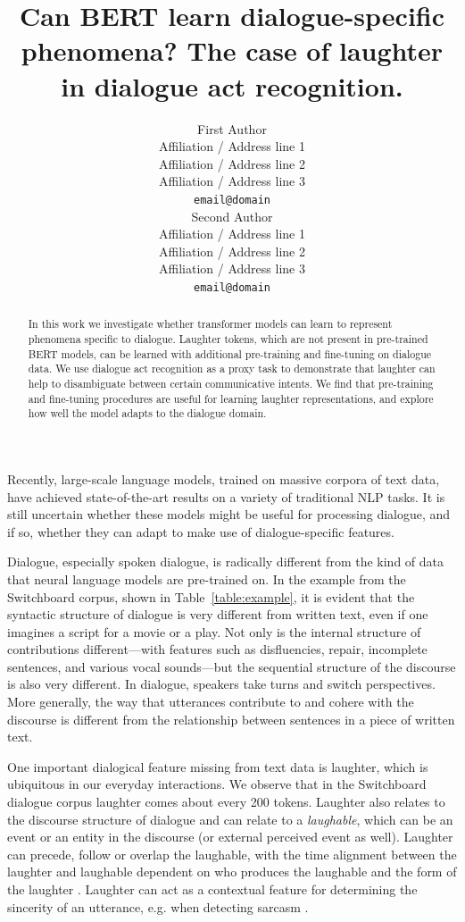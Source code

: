 \documentclass[11pt,a4paper]{article}
\title{Can BERT learn dialogue-specific phenomena? The case of laughter in dialogue act recognition. }
\author{First Author \\
  Affiliation / Address line 1 \\
  Affiliation / Address line 2 \\
  Affiliation / Address line 3 \\
  \texttt{email@domain} \\\And
  Second Author \\
  Affiliation / Address line 1 \\
  Affiliation / Address line 2 \\
  Affiliation / Address line 3 \\
  \texttt{email@domain} \\}
\date{}
\begin{document}
\maketitle
\begin{abstract}
   In this work we investigate whether transformer models can learn to represent phenomena specific to dialogue.
   Laughter tokens, which are not present in pre-trained BERT models, can be learned with additional pre-training and fine-tuning on dialogue data. 
   We use dialogue act recognition as a proxy task to demonstrate that laughter can help to disambiguate between certain communicative intents.
   We find that pre-training and fine-tuning procedures are useful for learning laughter representations, and explore how well the model adapts to the dialogue domain.
\end{abstract}


Recently, large-scale language models, trained on massive corpora of text data, have achieved state-of-the-art results on a variety of traditional NLP tasks.
It is still uncertain whether these models might be useful for processing dialogue, and if so, whether they can adapt to make use of dialogue-specific features.

Dialogue, especially spoken dialogue, is radically different from the kind of data that neural language models are pre-trained on.
In the example from the Switchboard corpus, shown in Table~\ref{table:example}, it is evident that the syntactic structure of dialogue is very different from  written text, even if one imagines a script for a movie or a play.
Not only is the internal structure of contributions different---with features such as disfluencies, repair, incomplete sentences, and various vocal sounds---but the sequential structure of the discourse is also very different.
In dialogue, speakers take turns and switch perspectives.
More generally, the way that utterances contribute to and cohere with the discourse is different from the relationship between sentences in a piece of written text.

One important dialogical feature missing from text data is laughter, which is ubiquitous in our everyday interactions.
We observe that in the Switchboard dialogue corpus laughter comes about every 200 tokens.
Laughter also relates to the discourse structure of dialogue and can relate to a \emph{laughable}, which can be an event or an entity in the discourse (or external perceived event as well).
Laughter can precede, follow or overlap the laughable, with the time alignment between the laughter and laughable dependent on who produces the laughable and the form of the laughter \citep{tian2016we}.
Laughter can act as a contextual feature for determining the sincerity of an utterance, e.g. when detecting sarcasm \citep{tepperman2006yeah}.
\end{document}
